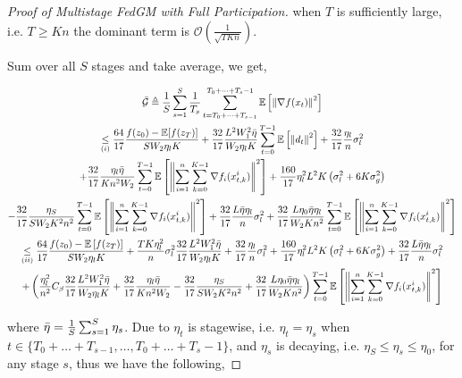 \begin{proof}[Proof of Multistage FedGM with Full Participation]
when $T$ is sufficiently large, i.e. $T\ge Kn$ the dominant term is $\mathcal{O}\left(\frac{1}{\sqrt{TKn}}\right)$.

\fi




Sum over all $S$ stages and take average, we get,

\begin{equation}
\begin{gathered}
\Bar{\mathcal{G}} \triangleq \frac{1}{S} \sum_{s=1}^{S} \frac{1}{T_s} \sum_{t=T_0+\dots+T_{s-1}}^{T_0+\dots+T_s-1} \mathbb{E}\left[\left\|\nabla f(x_t)\right\|^2\right]\\
\underset{(i)}{\leq} \frac{64}{17}\frac{f(z_0)-\mathbb{E}[f(z_{T})]}{S W_2 \eta_l K} + \frac{32}{17} \frac{L^2 W_1^2 \Bar{\eta} }{ W_2\eta_l K}\sum_{t=0}^{T-1}\mathbb{E}\left[\left\| d_t\right\|^2\right]+\frac{32}{17}\frac{\eta_l}{n}\sigma_l^2\\
+\frac{32}{17} \frac{\eta_l\Bar{\eta}}{Kn^2  W_2}\sum_{t=0}^{T-1}\mathbb{E}\left[\left\| \sum_{i=1}^n\sum_{k=0}^{K-1}  \nabla f_i(x_{t,k}^i) \right\|^2\right] +\frac{160}{17} \eta_l^2L^2K \left(\sigma_l^2+6K\sigma_g^2\right)\\
-\frac{32}{17}\frac{\eta_S}{S W_2 K^2 n^2}\sum_{t=0}^{T-1} \mathbb{E}\left[\left\| \sum_{i=1}^n\sum_{k=0}^{K-1} \nabla f_i(x_{t,k}^i)\right\|^2\right] 
+ \frac{32}{17} \frac{L \Bar{\eta} \eta_l }{n}\sigma_l^2 + \frac{32}{17} \frac{L \eta_0\Bar{\eta}  \eta_l }{ W_2 K n^2}\sum_{t=0}^{T-1}\mathbb{E}\left[\left\| \sum_{i=1}^n\sum_{k=0}^{K-1}  \nabla f_i(x_{t,k}^i) \right\|^2\right]\\
\underset{(ii)}{\leq} \frac{64}{17}\frac{f(z_0)-\mathbb{E}\left[f(z_{T})\right]}{S W_2 \eta_l K} + \frac{T K\eta_l^2}{n} \sigma^2_l \frac{32}{17} \frac{L^2 W_1^2 \Bar{\eta}}{W_2\eta_l K} 
+\frac{32}{17}\frac{\eta_l}{n}\sigma_l^2  +\frac{160}{17} \eta_l^2L^2K \left(\sigma_l^2+6K\sigma_g^2\right)+\frac{32}{17} \frac{L \Bar{\eta} \eta_l }{n}\sigma_l^2\\
+\left(\frac{\eta^2_l}{n^2} C_\beta \frac{32}{17} \frac{L^2 W_1^2 \Bar{\eta}}{W_2\eta_l K} +  \frac{32}{17} \frac{\eta_l\Bar{\eta}}{Kn^2 W_2} - \frac{32}{17}\frac{\eta_S}{S W_2K^2n^2} + \frac{32}{17} \frac{L \eta_0\Bar{\eta}  \eta_l }{W_2 K n^2} \right)\sum_{t=0}^{T-1}\mathbb{E}\left[\left\| \sum_{i=1}^n\sum_{k=0}^{K-1}  \nabla f_i(x_{t,k}^i) \right\|^2\right]
\end{gathered}\nonumber
\end{equation}

where $\Bar{\eta}=\frac{1}{S}\sum_{s=1}^S \eta_s$. Due to $\eta_t$ is stagewise, i.e. $\eta_t=\eta_s$ when $t\in \{T_0+\dots+T_{s-1},\dots,T_0+\dots+T_s-1\}$, and $\eta_s$ is decaying, i.e. $\eta_S \leq \eta_s \leq \eta_0$, for any stage $s$, thus we have the following,


\end{proof}

